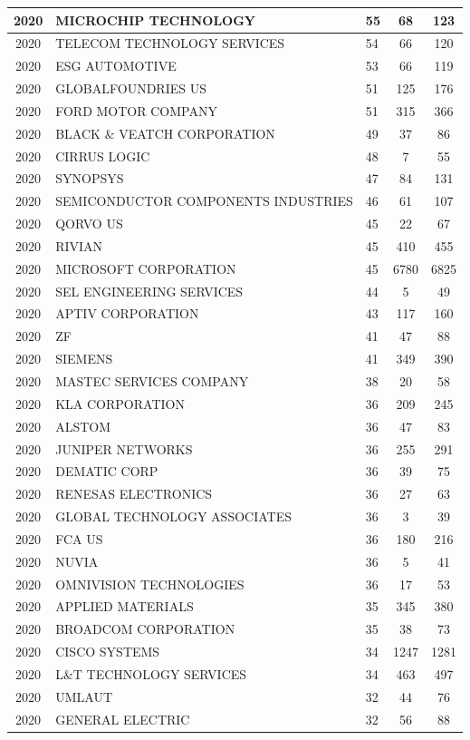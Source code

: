 \documentclass{article}%
\begin{document}
\begin{longtable}{c|p{20em}|p{5em}|c|c}
\hline%
2020&MICROCHIP TECHNOLOGY&55&68&123\\%
\hline%
2020&TELECOM TECHNOLOGY SERVICES&54&66&120\\%
\hline%
2020&ESG AUTOMOTIVE&53&66&119\\%
\hline%
2020&GLOBALFOUNDRIES US&51&125&176\\%
\hline%
2020&FORD MOTOR COMPANY&51&315&366\\%
\hline%
2020&BLACK \& VEATCH CORPORATION&49&37&86\\%
\hline%
2020&CIRRUS LOGIC&48&7&55\\%
\hline%
2020&SYNOPSYS&47&84&131\\%
\hline%
2020&SEMICONDUCTOR COMPONENTS INDUSTRIES&46&61&107\\%
\hline%
2020&QORVO US&45&22&67\\%
\hline%
2020&RIVIAN&45&410&455\\%
\hline%
2020&MICROSOFT CORPORATION&45&6780&6825\\%
\hline%
2020&SEL ENGINEERING SERVICES&44&5&49\\%
\hline%
2020&APTIV CORPORATION&43&117&160\\%
\hline%
2020&ZF&41&47&88\\%
\hline%
2020&SIEMENS&41&349&390\\%
\hline%
2020&MASTEC SERVICES COMPANY&38&20&58\\%
\hline%
2020&KLA CORPORATION&36&209&245\\%
\hline%
2020&ALSTOM&36&47&83\\%
\hline%
2020&JUNIPER NETWORKS&36&255&291\\%
\hline%
2020&DEMATIC CORP&36&39&75\\%
\hline%
2020&RENESAS ELECTRONICS&36&27&63\\%
\hline%
2020&GLOBAL TECHNOLOGY ASSOCIATES&36&3&39\\%
\hline%
2020&FCA US&36&180&216\\%
\hline%
2020&NUVIA&36&5&41\\%
\hline%
2020&OMNIVISION TECHNOLOGIES&36&17&53\\%
\hline%
2020&APPLIED MATERIALS&35&345&380\\%
\hline%
2020&BROADCOM CORPORATION&35&38&73\\%
\hline%
2020&CISCO SYSTEMS&34&1247&1281\\%
\hline%
2020&L\&T TECHNOLOGY SERVICES&34&463&497\\%
\hline%
2020&UMLAUT&32&44&76\\%
\hline%
2020&GENERAL ELECTRIC&32&56&88\\%

\end{longtable}
\end{document}
